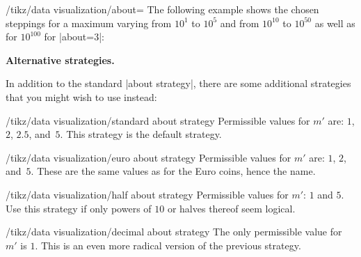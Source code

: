 \begin{key}{/tikz/data visualization/about=}
    The following example shows the chosen steppings for a maximum varying from
    $10^1$ to $10^5$ and from $10^{10}$ to $10^{50}$ as well as for $10^{100}$
    for |about=3|:

    \medskip


    \medskip
    \textbf{Alternative strategies.}

    In addition to the standard |about strategy|, there are some additional strategies that you might wish to use instead:

    \begin{key}{/tikz/data visualization/standard about strategy}
        Permissible values for $m'$ are: $1$, $2$, $2.5$, and~$5$. This strategy is the default strategy.
    \end{key}

    \begin{key}{/tikz/data visualization/euro about strategy}
        Permissible values for $m'$ are: $1$, $2$, and~$5$. These are the same values as for the Euro coins, hence the name.

    \end{key}

    \begin{key}{/tikz/data visualization/half about strategy}
        Permissible values for $m'$: $1$ and $5$. Use this strategy if only powers of $10$ or halves thereof seem logical.

    \end{key}

    \begin{key}{/tikz/data visualization/decimal about strategy}
        The only permissible value for $m'$ is $1$. This is an even more radical version of the previous strategy.

    \end{key}


\end{key}
